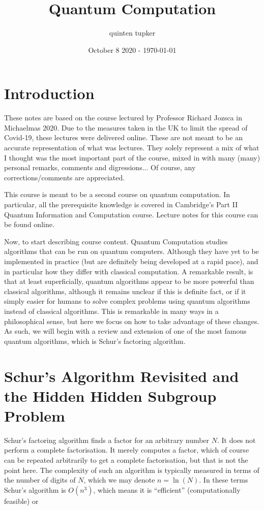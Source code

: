 \documentclass{article}
\title{Quantum Computation}
\author{quinten tupker}
\date{October 8 2020 - \today}
\theoremstyle{definition}
\begin{document}
\maketitle

\section*{Introduction}

These notes are based on the course lectured by Professor Richard Jozsca in
Michaelmas 2020. Due to the measures taken in the UK to limit the spread of
Covid-19, these lectures were delivered online. These are not meant to be an
accurate representation of what was lectures. They solely represent a mix of
what I thought was the most important part of the course, mixed in with many
(many) personal remarks, comments and digressions... Of course, any
corrections/comments are appreciated.

This course is meant to be a second course on quantum computation. In
particular, all the prerequisite knowledge is covered in Cambridge's Part II
Quantum Information and Computation course. Lecture notes for this course can be
found online.

Now, to start describing course content. Quantum Computation studies algorithms
that can be run on quantum computers. Although they have yet to be implemented
in practice (but are definitely being developed at a rapid pace), and in
particular how they differ with classical computation. A remarkable result, is
that at least superficially, quantum algorithms appear to be more powerful than
classical algorithms, although it remains unclear if this is definite fact, or
if it simply easier for humans to solve complex problems using quantum
algorithms instead of classical algorithms. This is remarkable in many ways in a
philosophical sense, but here we focus on how to take advantage of these
changes. As such, we will begin with a review and extension of one of the most
famous quantum algorithms, which is Schur's factoring algorithm.

\section{Schur's Algorithm Revisited and the Hidden Hidden Subgroup Problem}

Schur's factoring algorithm finds a factor for an arbitrary number $N$. It does
not perform a complete factorisation. It merely computes a factor, which of
course can be repeated arbitrarily to get a complete factorisation, but that is
not the point here. The complexity of such an algorithm is typically measured in
terms of the number of digits of $N$, which we may denote $n = \ln(N)$. In these
terms Schur's algorithm is $O(n^3)$, which means it is ``efficient''
(computationally feasible) or
\end{document}
